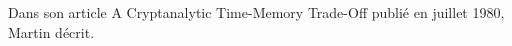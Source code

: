 Dans son article \og{}A Cryptanalytic Time-Memory Trade-Off\fg{}\cite{ehellman} publié en juillet 1980, Martin  décrit.

\endinput{}
